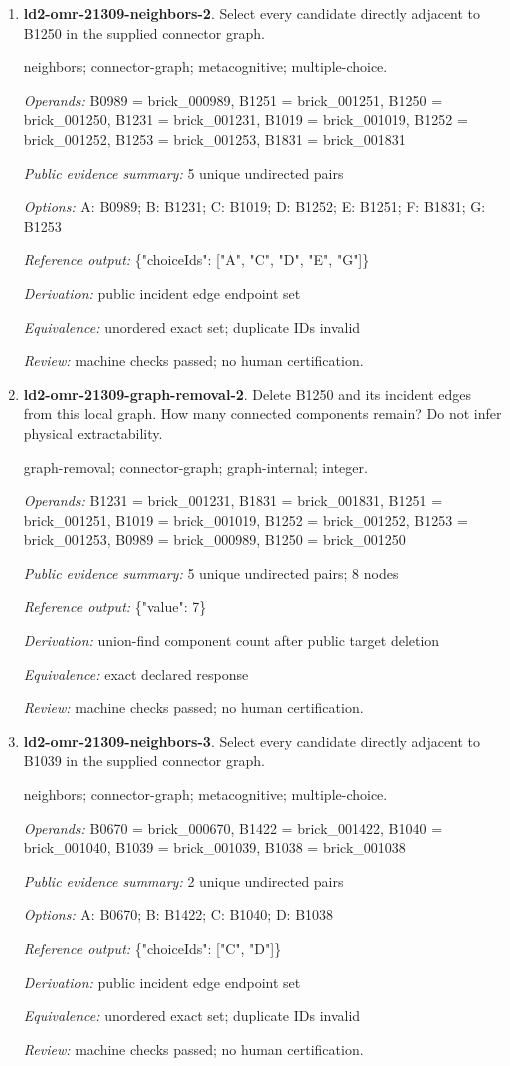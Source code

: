 \begin{enumerate}
\item \textbf{ld2-omr-21309-neighbors-2}. Select every candidate directly adjacent to B1250 in the supplied connector graph.
\par{\small neighbors; connector-graph; metacognitive; multiple-choice.\par\textit{Operands:} B0989 = brick\_000989, B1251 = brick\_001251, B1250 = brick\_001250, B1231 = brick\_001231, B1019 = brick\_001019, B1252 = brick\_001252, B1253 = brick\_001253, B1831 = brick\_001831\par\textit{Public evidence summary:} 5 unique undirected pairs\par\textit{Options:} A: B0989; B: B1231; C: B1019; D: B1252; E: B1251; F: B1831; G: B1253\par\textit{Reference output:} \{"choiceIds": ["A", "C", "D", "E", "G"]\}\par\textit{Derivation:} public incident edge endpoint set\par\textit{Equivalence:} unordered exact set; duplicate IDs invalid\par\textit{Review:} machine checks passed; no human certification.}
\item \textbf{ld2-omr-21309-graph-removal-2}. Delete B1250 and its incident edges from this local graph. How many connected components remain? Do not infer physical extractability.
\par{\small graph-removal; connector-graph; graph-internal; integer.\par\textit{Operands:} B1231 = brick\_001231, B1831 = brick\_001831, B1251 = brick\_001251, B1019 = brick\_001019, B1252 = brick\_001252, B1253 = brick\_001253, B0989 = brick\_000989, B1250 = brick\_001250\par\textit{Public evidence summary:} 5 unique undirected pairs; 8 nodes\par\textit{Reference output:} \{"value": 7\}\par\textit{Derivation:} union-find component count after public target deletion\par\textit{Equivalence:} exact declared response\par\textit{Review:} machine checks passed; no human certification.}
\item \textbf{ld2-omr-21309-neighbors-3}. Select every candidate directly adjacent to B1039 in the supplied connector graph.
\par{\small neighbors; connector-graph; metacognitive; multiple-choice.\par\textit{Operands:} B0670 = brick\_000670, B1422 = brick\_001422, B1040 = brick\_001040, B1039 = brick\_001039, B1038 = brick\_001038\par\textit{Public evidence summary:} 2 unique undirected pairs\par\textit{Options:} A: B0670; B: B1422; C: B1040; D: B1038\par\textit{Reference output:} \{"choiceIds": ["C", "D"]\}\par\textit{Derivation:} public incident edge endpoint set\par\textit{Equivalence:} unordered exact set; duplicate IDs invalid\par\textit{Review:} machine checks passed; no human certification.}

\end{enumerate}
